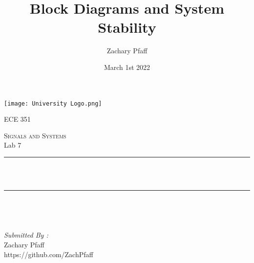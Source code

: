 \documentclass[12pt]{report}
\title{Block Diagrams and System Stability}
\author{Zachary Pfaff}
\date{March 1st 2022}
\makeatletter
\let\thetitle\@title
\makeatother
\begin{document}
\begin{titlepage}
\centering
\vspace*{0.5 cm}
\texttt{[image: University Logo.png]}\\
\begin{center}    \textsc{\Large   ECE 351}\\[2.0 cm]
\end{center}%
\textsc{\Large Signals and Systems  }\\[0.5 cm] %
Lab 7
\rule{\linewidth}{0.2 mm} \\[0.4 cm]
{ \huge \bfseries \thetitle}\\
\rule{\linewidth}{0.2 mm} \\[1.5 cm]
\begin{minipage}{0.4\textwidth}
\begin{flushleft} \large
\end{flushleft}
\end{minipage}~
\begin{minipage}{0.4\textwidth}
\begin{flushright} \large
\emph{Submitted By :} \\
Zachary Pfaff\\https://github.com/ZachPfaff
\end{flushright}
\end{minipage}\\[2 cm]
\end{titlepage}
\tableofcontents
\pagebreak
\renewcommand{\thesection}{\arabic{section}}
\setlength{\parindent}{20pt}

\maketitle
\end{document}

